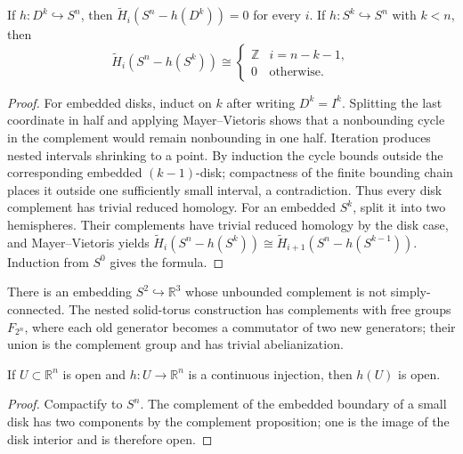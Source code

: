 \begin{proposition}
\label{prop:homology-sphere-complement-disk-sphere}
If $h:D^k\hookrightarrow S^n$, then $\widetilde H_i(S^n-h(D^k))=0$ for every $i$.  If $h:S^k\hookrightarrow S^n$ with $k<n$, then
\[
\widetilde H_i(S^n-h(S^k))\cong\begin{cases}\mathbb{Z}&i=n-k-1,\\0&\text{otherwise}.\end{cases}
\]
\end{proposition}
\begin{proof}
\sketch For embedded disks, induct on $k$ after writing $D^k=I^k$. Splitting
the last coordinate in half and applying Mayer--Vietoris shows that a
nonbounding cycle in the complement would remain nonbounding in one half.
Iteration produces nested intervals shrinking to a point. By induction the
cycle bounds outside the corresponding embedded $(k-1)$-disk; compactness of
the finite bounding chain places it outside one sufficiently small interval,
a contradiction. Thus every disk complement has trivial reduced homology.
For an embedded $S^k$, split it into two hemispheres. Their complements have
trivial reduced homology by the disk case, and Mayer--Vietoris yields
$\widetilde H_i(S^n-h(S^k))\cong
\widetilde H_{i+1}(S^n-h(S^{k-1}))$. Induction from $S^0$ gives the formula.
\end{proof}

\begin{example}
\label{ex:alexander-horned-sphere}
There is an embedding $S^2\hookrightarrow\mathbb{R}^3$ whose unbounded complement is not simply-connected.  The nested solid-torus construction has complements with free groups $F_{2^n}$, where each old generator becomes a commutator of two new generators; their union is the complement group and has trivial abelianization.
\end{example}

\begin{theorem}
\label{thm:invariance-of-domain-general}
If $U\subset\mathbb{R}^n$ is open and $h:U\to\mathbb{R}^n$ is a continuous injection, then $h(U)$ is open.
\end{theorem}
\begin{proof}
\sketch Compactify to $S^n$.  The complement of the embedded boundary of a small disk has two components by the complement proposition; one is the image of the disk interior and is therefore open.
\end{proof}

